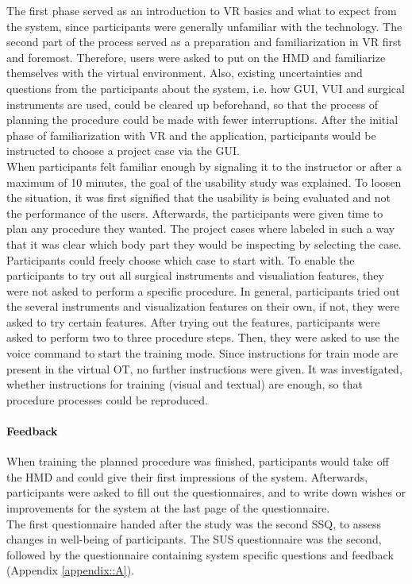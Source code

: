 The first phase served as an introduction to VR basics and what to expect from the system, since participants were generally unfamiliar with the technology.
The second part of the process served as a preparation and familiarization in VR first and foremost.
Therefore, users were asked to put on the HMD and familiarize themselves with the virtual environment.
Also, existing uncertainties and questions from the participants about the system, i.e. how GUI, VUI and surgical instruments are used, could be cleared up beforehand, so that the process of 
planning the procedure could be made with fewer interruptions.
After the initial phase of familiarization with VR and the application, participants would be instructed to choose a project case via the GUI.
\\ When participants felt familiar enough by signaling it to the instructor or after a maximum of 10 minutes, the goal of the usability study was explained.
To loosen the situation, it was first signified that the usability is being evaluated and not the performance of the users.
Afterwards, the participants were given time to plan any procedure they wanted.
The project cases where labeled in such a way that it was clear which body part they would be inspecting by selecting the case.
Participants could freely choose which case to start with.
To enable the participants to try out all surgical instruments and visualiation features, they were not asked to perform a specific procedure.
In general, participants tried out the several instruments and visualization features on their own, if not, they were asked to try certain features.
After trying out the features, participants were asked to perform two to three procedure steps.
Then, they were asked to use the voice command to start the training mode.
Since instructions for train mode are present in the virtual OT, no further instructions were given.
It was investigated, whether instructions for training (visual and textual) are enough, so that procedure processes could be reproduced.

\paragraph{\textbf{Feedback}}

When training the planned procedure was finished, participants would take off the HMD and could give their first impressions of the system.
Afterwards, participants were asked to fill out the questionnaires, and to write down wishes or improvements for the system at the last page of the questionnaire.
\\ The first questionnaire handed after the study was the second SSQ, to assess changes in well-being of participants.
The SUS questionnaire was the second, followed by the questionnaire containing system specific questions and feedback (Appendix \ref{appendix::A}).
